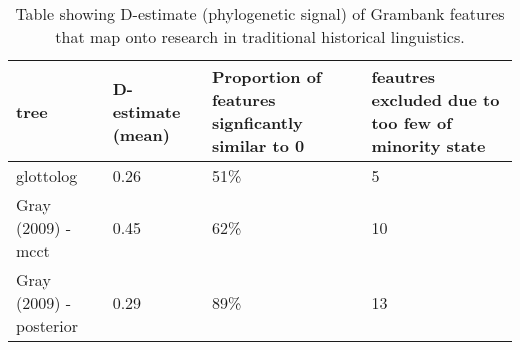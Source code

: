\begin{table}[ht]
\centering
\begin{tabular}{p{5cm}p{3cm}p{4cm}p{4cm}}
  \hline
tree & D-estimate (mean) & Proportion of features signficantly similar to 0 & feautres excluded due to too few of minority state \\ 
  \hline
glottolog & 0.26 & 51\% &   5 \\ 
  Gray (2009) - mcct & 0.45 & 62\% &  10 \\ 
  Gray (2009) - posterior & 0.29 & 89\% &  13 \\ 
   \hline
\end{tabular}
\caption{Table showing D-estimate (phylogenetic signal) of Grambank features that map onto research in traditional historical linguistics.} 
\label{d_estimate_summary}
\end{table}

